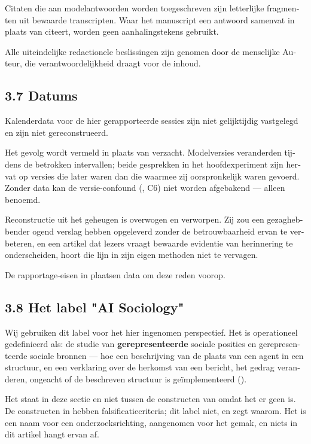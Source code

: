 \begin{dutch}
Citaten die aan modelantwoorden worden toegeschreven zijn letterlijke fragmenten uit bewaarde transcripten. Waar het manuscript een antwoord samenvat in plaats van citeert, worden geen aanhalingstekens gebruikt.

Alle uiteindelijke redactionele beslissingen zijn genomen door de menselijke Auteur, die verantwoordelijkheid draagt voor de inhoud.


\subsection*{3.7 Datums}
\label{sec:nl:3.7}

Kalenderdata voor de hier gerapporteerde sessies zijn niet gelijktijdig vastgelegd en zijn niet gereconstrueerd.

Het gevolg wordt vermeld in plaats van verzacht. Modelversies veranderden tijdens de betrokken intervallen; beide gesprekken in het hoofdexperiment zijn hervat op versies die later waren dan die waarmee zij oorspronkelijk waren gevoerd. Zonder data kan de versie-confound (, C6) niet worden afgebakend — alleen benoemd.

Reconstructie uit het geheugen is overwogen en verworpen. Zij zou een gezaghebbender ogend verslag hebben opgeleverd zonder de betrouwbaarheid ervan te verbeteren, en een artikel dat lezers vraagt bewaarde evidentie van herinnering te onderscheiden, hoort die lijn in zijn eigen methoden niet te vervagen.

De rapportage-eisen in  plaatsen data om deze reden voorop.


\subsection*{3.8 Het label "AI Sociology"}
\label{sec:nl:3.8}

Wij gebruiken dit label voor het hier ingenomen perspectief. Het is operationeel gedefinieerd als: de studie van \textbf{gerepresenteerde} sociale posities en gerepresenteerde sociale bronnen — hoe een beschrijving van de plaats van een agent in een structuur, en een verklaring over de herkomst van een bericht, het gedrag veranderen, ongeacht of de beschreven structuur is geïmplementeerd ().

Het staat in deze sectie en niet tussen de constructen van  omdat het er geen is. De constructen in  hebben falsificatiecriteria; dit label niet, en  zegt waarom. Het is een naam voor een onderzoeksrichting, aangenomen voor het gemak, en niets in dit artikel hangt ervan af.


\end{dutch}
